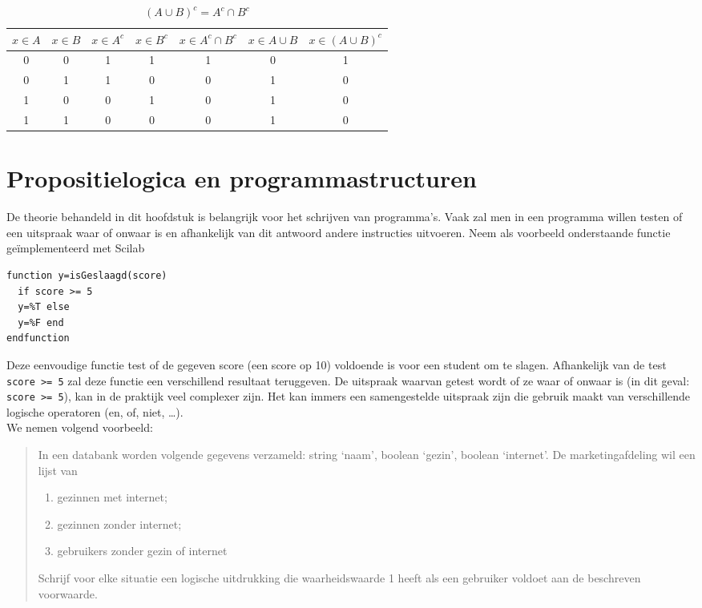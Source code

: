 \begin{table}
\caption{$(A\cup B)^c=A^c\cap B^c$} \label{tbl:gelijkeVerzamelingen}
\begin{tabular}{ccccccc}
\toprule
$x\in A$ & $x\in B$ & $x\in A^c$ & $x\in B^c$ & $x\in A^c\cap B^c$ & $x\in A\cup B$ & $x\in (A\cup B)^c$ \\ 
\midrule
0 & 0 & 1 & 1 & 1 & 0 & 1 \\ 
0 & 1 & 1 & 0 & 0 & 1 & 0 \\ 
1 & 0 & 0 & 1 & 0 & 1 & 0 \\ 
1 & 1 & 0 & 0 & 0 & 1 & 0 \\ 
\bottomrule
\end{tabular} 
\end{table}

\section{Propositielogica en programmastructuren}

De theorie behandeld in dit hoofdstuk is belangrijk voor het schrijven van programma’s. Vaak zal men in een programma willen testen of een uitspraak waar of onwaar is en afhankelijk van dit antwoord andere instructies uitvoeren.
Neem als voorbeeld onderstaande functie geïmplementeerd met Scilab
\begin{lstlisting}
function y=isGeslaagd(score) 
  if score >= 5
  y=%T else
  y=%F end
endfunction
\end{lstlisting}
Deze eenvoudige functie test of de gegeven score (een score op 10) voldoende is voor een student om te slagen. Afhankelijk van de test \verb+score >= 5+ zal deze functie een verschillend resultaat teruggeven. De uitspraak waarvan getest wordt of ze waar of onwaar is (in dit geval: \verb+score >= 5+), kan in de praktijk veel complexer zijn. Het kan immers een samengestelde uitspraak zijn die gebruik maakt van verschillende logische operatoren (en, of, niet, \dots).\\

We nemen volgend voorbeeld:
\begin{quote}
In een databank worden volgende gegevens verzameld: string `naam', boolean `gezin', boolean `internet'. De marketingafdeling wil een lijst van 
\begin{enumerate}
\item gezinnen met internet;
\item gezinnen zonder internet;
\item gebruikers zonder gezin of internet
\end{enumerate}
Schrijf voor elke situatie een logische uitdrukking die waarheidswaarde 1 heeft als een gebruiker voldoet aan de beschreven voorwaarde.
\end{quote}

